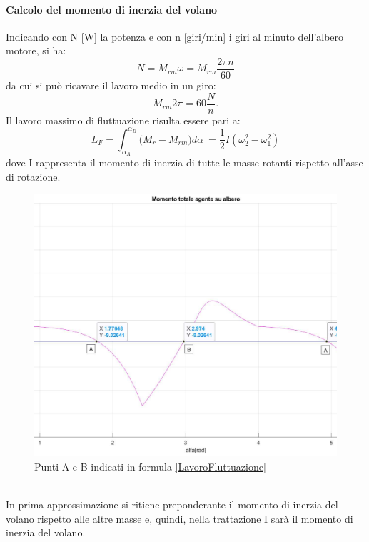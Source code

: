 \paragraph{Calcolo del momento di inerzia del volano}
Indicando con N [W] la potenza e con n [giri/min] i giri al minuto dell’albero motore, si ha:
\begin{equation}
    N=M_{rm}\omega=M_{rm}\frac{2\pi n}{60}
\end{equation}
da cui si può ricavare il lavoro medio in un giro: 
\begin{equation}
    M_{rm}2\pi=60\frac{N}{n}.
    \label{LavoroMedioGiro}
\end{equation}
Il lavoro massimo di fluttuazione risulta essere pari a: 
\begin{equation}
    L_F=\int_{\alpha_A}^{\alpha_B}{(M_r-}M_{rm})d\alpha\ =\frac{1}{2}I\left(\omega_2^2-\omega_1^2\right)
    \label{LavoroFluttuazione}
\end{equation}
dove I rappresenta il momento di inerzia di tutte le masse rotanti rispetto all’asse di rotazione.\\
\begin{figure}[h]
    \centering
    \includegraphics[scale=0.3]{Immagini/GraficoPuntiMomento.png}
    \caption{Punti A e B indicati in formula \ref{LavoroFluttuazione}}
    \label{fig:GraficoPuntiMomento}
\end{figure}
\\
In prima approssimazione si ritiene preponderante il momento di inerzia del volano rispetto alle altre masse e, quindi, nella trattazione I sarà il momento di inerzia del volano.\\
